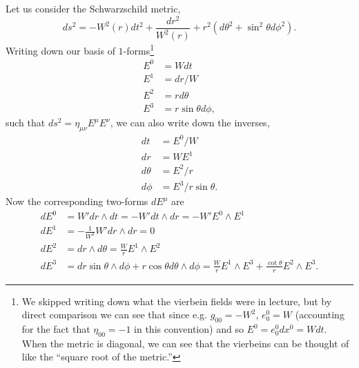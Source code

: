 \begin{exm}
Let us consider the Schwarzschild metric,
$$ds^2=-W^2(r)dt^2 +\frac{dr^2}{W^2(r)}+r^2(d\theta^2+\sin^2\theta d\phi^2).$$
Writing down our basis of $1$-forms\footnote{We skipped writing down what the vierbein fields were in lecture, but by direct comparison we can see that since e.g. $g_{00}=-W^2$, $e^0_0 =W$ (accounting for the fact that $\eta_{00}=-1$ in this convention) and so $E^0=e^0_0 dx^0=W dt$. When the metric is diagonal, we can see that the vierbeins can be thought of like the ``square root of the metric.''}
\begin{align*}
    E^0 &= W dt\\
    E^1 &= dr/W\\
    E^2 &= rd\theta\\
    E^3 &= r\sin\theta d\phi,
\end{align*}
such that $ds^2 = \eta_{\mu\nu}E^\mu E^\nu$, we can also write down the inverses,
\begin{align*}
    dt&= E^0/W\\
    dr&= W E^1\\
    d\theta &= E^2/r\\
    d\phi &= E^3/r\sin\theta.
\end{align*}
Now the corresponding two-forms $dE^\mu$ are
\begin{align*}
    dE^0 &= W' dr \wedge dt = -W' dt \wedge dr = -W' E^0 \wedge E^1\\
    dE^1 &=-\frac{1}{W^2} W' dr \wedge dr = 0\\
    dE^2 &= dr\wedge d\theta =\frac{W}{r} E^1 \wedge E^2\\
    dE^3 &= dr \sin\theta \wedge d\phi+ r\cos\theta d\theta \wedge d\phi = \frac{W}{r} E^1 \wedge E^3 + \frac{\cot \theta}{r} E^2 \wedge E^3.
\end{align*}
\end{exm}